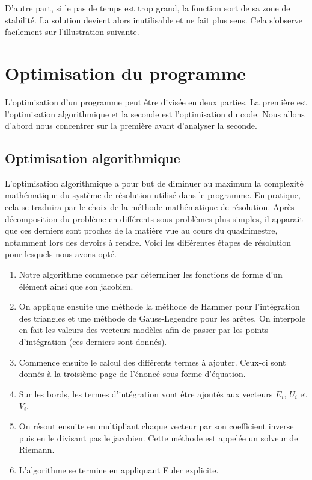 \documentclass{article}
\begin{document}
	D'autre part, si le pas de temps est trop grand, la fonction sort de sa zone de stabilité.
	La solution devient alors inutilisable et ne fait plus sens.
	Cela s'observe facilement sur l'illustration suivante.
\section{Optimisation du programme}
	L'optimisation d'un programme peut être divisée en deux parties. 
	La première est l'optimisation algorithmique et la seconde est l'optimisation du code. 
	Nous allons d'abord nous concentrer sur la première avant d'analyser la seconde.
	\subsection{Optimisation algorithmique}
		L'optimisation algorithmique a pour but de diminuer au maximum la complexité mathématique du système de résolution utilisé dans le programme.
		En pratique, cela se traduira par le choix de la méthode mathématique de résolution.
		Après décomposition du problème en différents sous-problèmes plus simples, il apparait que ces derniers sont proches de la matière vue au cours du quadrimestre, notamment lors des devoirs à rendre.
		Voici les différentes étapes de résolution pour lesquels nous avons opté.
		\begin{enumerate}
			\item 
				Notre algorithme commence par déterminer les fonctions de forme d'un élément ainsi que son jacobien.
			\item 
				On applique ensuite une méthode la méthode de Hammer pour l'intégration des triangles et une méthode de Gauss-Legendre pour les arêtes. 
				On interpole en fait les valeurs des vecteurs modèles afin de passer par les points d'intégration (ces-derniers sont donnés).
			\item 
				Commence ensuite le calcul des différents termes à ajouter.
				Ceux-ci sont donnés à la troisième page de l'énoncé sous forme d'équation.
			\item
				Sur les bords, les termes d'intégration vont être ajoutés aux vecteurs $E_i$, $U_i$ et $V_i$.
			\item 
				On résout ensuite en multipliant chaque vecteur par son coefficient inverse puis en le divisant pas le jacobien.
				Cette méthode est appelée un solveur de Riemann.
			\item 
				L'algorithme se termine en appliquant Euler explicite.
		\end{enumerate}
\end{document}
